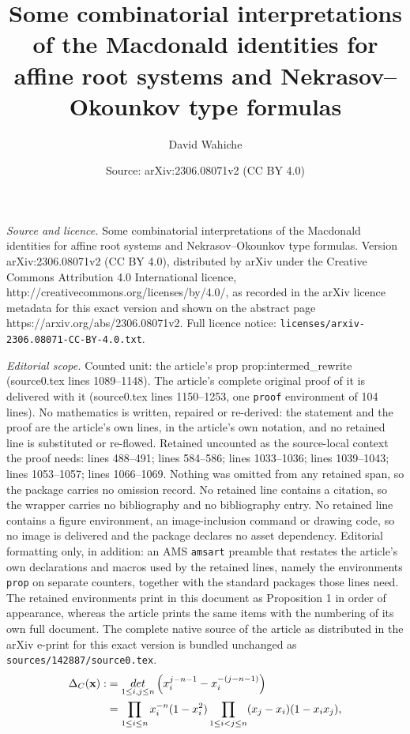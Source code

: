 \documentclass[10pt,a4paper]{amsart}
\title{Some combinatorial interpretations of the Macdonald identities for affine root systems and Nekrasov--Okounkov type formulas}
\author{David Wahiche}
\date{Source: arXiv:2306.08071v2 (CC BY 4.0)}
\def\det{{\rm det}}
\begin{document}
\maketitle

\noindent\emph{Source and licence.} Some combinatorial interpretations of the Macdonald identities for affine root systems and Nekrasov--Okounkov type formulas. Version arXiv:2306.08071v2 (CC BY 4.0), distributed by arXiv under the Creative Commons Attribution 4.0 International licence, http://creativecommons.org/licenses/by/4.0/, as recorded in the arXiv licence metadata for this exact version and shown on the abstract page https://arxiv.org/abs/2306.08071v2. Full licence notice: \texttt{licenses/arxiv-2306.08071-CC-BY-4.0.txt}.\par\smallskip

\noindent\textit{Editorial scope.} Counted unit: the article's prop prop:intermed\_rewrite (source0.tex lines 1089--1148). The article's complete original proof of it is delivered with it (source0.tex lines 1150--1253, one \texttt{proof} environment of 104 lines). No mathematics is written, repaired or re-derived: the statement and the proof are the article's own lines, in the article's own notation, and no retained line is substituted or re-flowed.  Retained uncounted as the source-local context the proof needs: lines 488--491; lines 584--586; lines 1033--1036; lines 1039--1043; lines 1053--1057; lines 1066--1069.  Nothing was omitted from any retained span, so the package carries no omission record.  No retained line contains a citation, so the wrapper carries no bibliography and no bibliography entry.  No retained line contains a figure environment, an image-inclusion command or drawing code, so no image is delivered and the package declares no asset dependency.  Editorial formatting only, in addition: an AMS \texttt{amsart} preamble that restates the article's own declarations and macros used by the retained lines, namely the environments \texttt{prop} on separate counters, together with the standard packages those lines need.  The retained environments print in this document as Proposition 1 in order of appearance, whereas the article prints the same items with the numbering of its own full document.  The complete native source of the article as distributed in the arXiv e-print for this exact version is bundled unchanged as \texttt{sources/142887/source0.tex}.
\begin{align}\label{def:deltac}
\Delta_C(\mathbf{x}):&=\underset{1\le i,j\le n}{\det}\left(x_i^{j-n-1}-x_i^{-(j-n-1)}\right)\notag
\\&=\prod_{1\le i \le n}x_i^{-n}(1-x_i^2)\prod_{1\le i<j\le n}(x_j-x_i)(1-x_ix_j),
\end{align}
\end{document}
